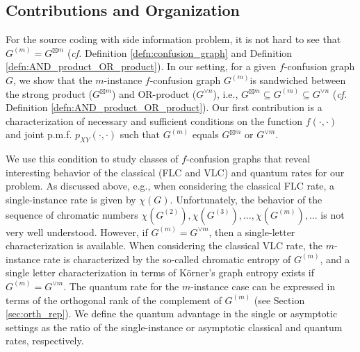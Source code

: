 \documentclass[journal, onecolumn, draftcls]{IEEEtran}
\theoremstyle{definition}
\newcommand{\meng}[1]{\marginpar{+}{\bf Ruoyu's remark}: {\em #1}}
\newcommand{\aditya}[1]{\marginpar{+}{\bf Aditya's remark}: {\em #1}}
\begin{document}

 



\subsection{Contributions and Organization}%
For the source coding with side information problem, it is not hard to see that $G^{(m)} = G^{
\boxtimes m}$ ({\it cf.} Definition \ref{defn:confusion_graph} and Definition \ref{defn:AND_product_OR_product}). In our setting, for a given $f$-confusion graph $G$, we show that the $m$-instance $f$-confusion graph $G^{(m)}$is sandwiched between the strong product ($G^{\boxtimes m}$) and OR-product ($G^{\lor n}$), i.e., $G^{\boxtimes m} \subseteq G^{(m)} \subseteq G^{\lor n}$ ({\it cf.}   Definition \ref{defn:AND_product_OR_product}). Our first contribution is a characterization of necessary and sufficient conditions on the function $f(\cdot, \cdot)$ and joint p.m.f. $p_{XY}(\cdot,\cdot)$ such that $G^{(m)}$ equals  $G^{\boxtimes m}$ or $G^{\lor m}$. 

We use this condition to study classes of $f$-confusion graphs that reveal interesting behavior of the classical (FLC and VLC) and quantum rates for our problem. As discussed above, e.g., when considering the classical FLC rate, a single-instance rate is given by $\chi(G)$. Unfortunately, the behavior of the sequence of chromatic numbers $\chi(G^{(2)}), \chi(G^{(3)}), \dots, \chi(G^{(m)}), \dots$ is not very well understood. However,  if $G^{(m)} = G^{\lor m}$, then a single-letter characterization is available. When considering the classical VLC rate, the $m$-instance rate is characterized by the so-called chromatic entropy of $G^{(m)}$, and a single letter characterization in terms of K\"orner's graph entropy \cite{Korner_73} exists if $G^{(m)} = G^{\lor m}$. The quantum rate for the $m$-instance case can be expressed in terms of the orthogonal rank of the complement of $G^{(m)}$ (see Section \ref{sec:orth_rep}). We define the quantum advantage in the single or asymptotic settings as the ratio of the single-instance or asymptotic classical and quantum rates, respectively.%
%
 
\end{document}
